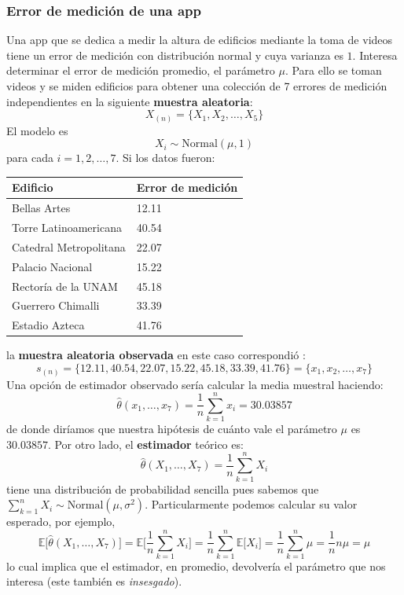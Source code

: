 \documentclass[
]{book}
\newenvironment{Ejemplo}
{\begin{mdframed}[
  linecolor=ejemplocolor,
  skipabove=12pt,
  skipbelow=12pt,
  roundcorner=20pt,
  splittopskip=2\topsep]}
{\end{mdframed}}
\begin{document}
\begin{Ejemplo}
\hypertarget{error-de-mediciuxf3n-de-una-app}{%
\subsubsection{Error de medición de una
app}\label{error-de-mediciuxf3n-de-una-app}}

Una app que se dedica a medir la altura de edificios mediante la toma de
videos tiene un error de medición con distribución normal y cuya
varianza es \(1\). Interesa determinar el error de medición promedio, el
parámetro \(\mu\). Para ello se toman videos y se miden edificios para
obtener una colección de 7 errores de medición independientes en la
siguiente \textbf{muestra aleatoria}: \[
X_{(n)} = \{X_1, X_2, \dots, X_{5} \}
\] El modelo es \[
X_i \sim \text{Normal}(\mu, 1)
\] para cada \(i = 1, 2, \dots, 7\). Si los datos fueron:

\begin{longtable}[]{@{}ll@{}}
\toprule
\textbf{Edificio} & \textbf{Error de medición}\tabularnewline
\midrule
\endhead
Bellas Artes & 12.11\tabularnewline
Torre Latinoamericana & 40.54\tabularnewline
Catedral Metropolitana & 22.07\tabularnewline
Palacio Nacional & 15.22\tabularnewline
Rectoría de la UNAM & 45.18\tabularnewline
Guerrero Chimalli & 33.39\tabularnewline
Estadio Azteca & 41.76\tabularnewline
\bottomrule
\end{longtable}

la \textbf{muestra aleatoria observada} en este caso correspondió : \[
s_{(n)} = \{12.11,40.54,22.07,15.22,45.18, 33.39, 41.76\} = \{x_1, x_2, \dots, x_7\}
\] Una opción de estimador observado sería calcular la media muestral
haciendo: \[
\hat{\theta}(x_1, \dots, x_7) = \frac{1}{n} \sum_{k = 1}^n x_i = 30.03857
\] de donde diríamos que nuestra hipótesis de cuánto vale el parámetro
\(\mu\) es \(30.03857\). Por otro lado, el \textbf{estimador} teórico
es: \[
\hat{\theta}(X_1, \dots, X_7) = \frac{1}{n} \sum_{k = 1}^n X_i 
\] tiene una distribución de probabilidad sencilla pues sabemos que
\(\sum_{k = 1}^n X_i \sim \textrm{Normal}(\mu,\sigma^2)\).
Particularmente podemos calcular su valor esperado, por ejemplo, \[
\mathbb{E}\Big[  \hat{\theta}(X_1, \dots, X_7) \Big]  =  \mathbb{E}\Big[  \frac{1}{n} \sum_{k = 1}^n X_i  \Big] = \frac{1}{n}\sum_{k = 1}^n \mathbb{E}\Big[X_i \Big] = \frac{1}{n}\sum_{k = 1}^n  \mu = \frac{1}{n} n\mu = \mu
\] lo cual implica que el estimador, en promedio, devolvería el
parámetro que nos interesa (este también es \emph{insesgado}).
\end{Ejemplo}
\end{document}
